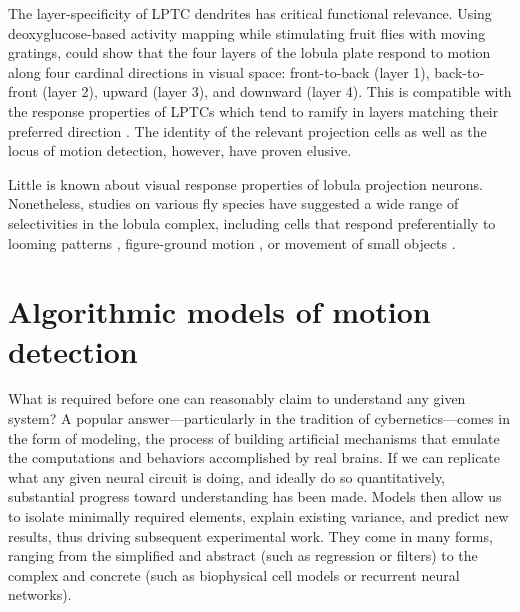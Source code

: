 The layer-specificity of LPTC dendrites has critical functional relevance. Using deoxyglucose-based activity mapping while stimulating fruit flies with moving gratings, \citet{Buchner:1984aa} could show that the four layers of the lobula plate respond to motion along four cardinal directions in visual space: front-to-back (layer 1), back-to-front (layer 2), upward (layer 3), and downward (layer 4). This is compatible with the response properties of LPTCs which tend to ramify in layers matching their preferred direction \citep{Heisenberg:1978aa,Schnell:2010ik}. The identity of the relevant projection cells as well as the locus of motion detection, however, have proven elusive.

Little is known about visual response properties of lobula projection neurons. Nonetheless, studies on various fly species have suggested a wide range of selectivities in the lobula complex, including cells that respond preferentially to looming patterns \citep{deVries:2012aa}, figure-ground motion \citep{Egelhaaf:1985aa}, or movement of small objects \citep{Barnett:2007fp}.



\section{Algorithmic models of motion detection}
What is required before one can reasonably claim to understand any given system? A popular answer---particularly in the tradition of cybernetics---comes in the form of modeling, the process of building artificial mechanisms that emulate the computations and behaviors accomplished by real brains. If we can replicate what any given neural circuit is doing, and ideally do so quantitatively, substantial progress toward understanding has been made. Models then allow us to isolate minimally required elements, explain existing variance, and predict new results, thus driving subsequent experimental work. They come in many forms, ranging from the simplified and abstract (such as regression or filters) to the complex and concrete (such as biophysical cell models or recurrent neural networks).

